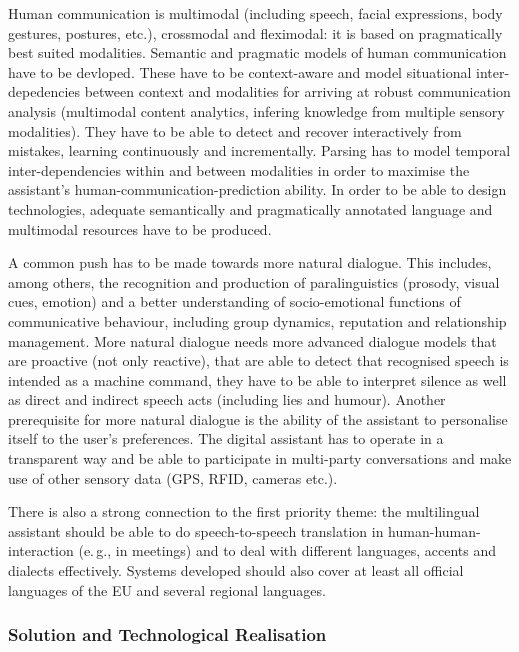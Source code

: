 \documentclass[10pt, plain]{../../metanetpaper}
\begin{document}
\begin{multicols}{2}
Human communication is multimodal (including speech, facial expressions, body gestures, postures, etc.), crossmodal and fleximodal: it is based on pragmatically best suited modalities. Semantic and pragmatic models of human communication have to be devloped. These have to be context-aware and model situational inter-depedencies between context and modalities for arriving at robust communication analysis (multimodal content analytics, infering knowledge from multiple sensory modalities). They have to be able to detect and recover interactively from mistakes, learning continuously and incrementally. Parsing has to model temporal inter-dependencies within and between modalities in order to maximise the assistant's human-communication-prediction ability. In order to be able to design technologies, adequate semantically and pragmatically annotated language and multimodal resources have to be produced.

A common push has to be made towards more natural dialogue. This includes, among others, the recognition and production of paralinguistics (prosody, visual cues, emotion) and a better understanding of socio-emotional functions of communicative behaviour, including group dynamics, reputation and relationship management. More natural dialogue needs more advanced dialogue models that are proactive (not only reactive), that are able to detect that recognised speech is intended as a machine command, they have to be able to interpret silence as well as direct and indirect speech acts (including lies and humour). Another prerequisite for more natural dialogue is the ability of the assistant to personalise itself to the user's preferences. The digital assistant has to operate in a transparent way and be able to participate in multi-party conversations and make use of other sensory data (GPS, RFID, cameras etc.).

There is also a strong connection to the first priority theme: the multilingual assistant should be able to do speech-to-speech translation in human-human-interaction (e.\,g., in meetings) and to deal with different languages, accents and dialects effectively. Systems developed should also cover at least all official languages of the EU and several regional languages.

\subsubsection{Solution and Technological Realisation}
\label{sec:solut-techn-real-pt3}


\end{multicols}
\end{document}
